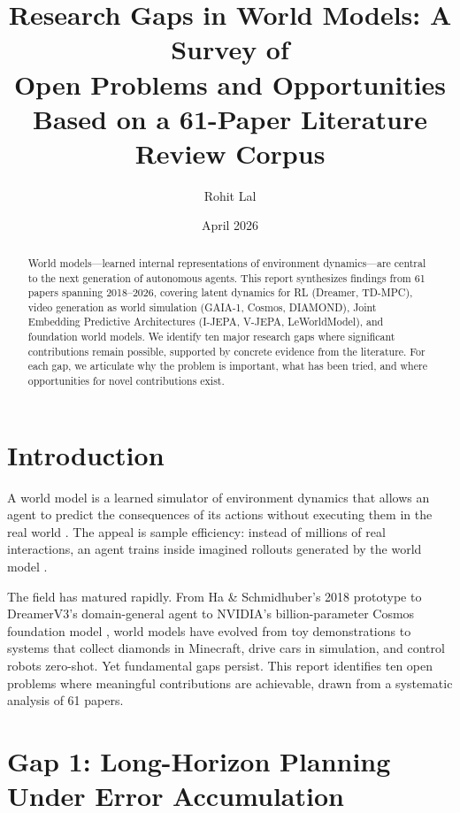 \documentclass[11pt,a4paper]{article}
\title{\textbf{Research Gaps in World Models: A Survey of\\Open Problems and Opportunities}\\[0.5em]\large Based on a 61-Paper Literature Review Corpus}
\author{Rohit Lal}
\date{April 2026}
\begin{document}
\maketitle

\begin{abstract}
World models---learned internal representations of environment dynamics---are central to the next generation of autonomous agents. This report synthesizes findings from 61 papers spanning 2018--2026, covering latent dynamics for RL (Dreamer, TD-MPC), video generation as world simulation (GAIA-1, Cosmos, DIAMOND), Joint Embedding Predictive Architectures (I-JEPA, V-JEPA, LeWorldModel), and foundation world models. We identify ten major research gaps where significant contributions remain possible, supported by concrete evidence from the literature. For each gap, we articulate why the problem is important, what has been tried, and where opportunities for novel contributions exist.
\end{abstract}

\tableofcontents
\newpage

\section{Introduction}

A world model is a learned simulator of environment dynamics that allows an agent to predict the consequences of its actions without executing them in the real world \citep{ha2018worldmodels, lecun2022path}. The appeal is sample efficiency: instead of millions of real interactions, an agent trains inside imagined rollouts generated by the world model \citep{hafner2021dreamerv2, hafner2023dreamerv3}.

The field has matured rapidly. From Ha \& Schmidhuber's 2018 prototype to DreamerV3's domain-general agent \citep{hafner2023dreamerv3} to NVIDIA's billion-parameter Cosmos foundation model \citep{agarwal2025cosmos}, world models have evolved from toy demonstrations to systems that collect diamonds in Minecraft, drive cars in simulation, and control robots zero-shot. Yet fundamental gaps persist. This report identifies ten open problems where meaningful contributions are achievable, drawn from a systematic analysis of 61 papers.

\section{Gap 1: Long-Horizon Planning Under Error Accumulation}
\end{document}
